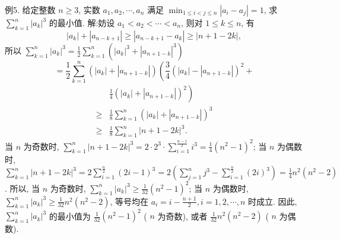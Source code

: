 例5. 给定整数 $n \geqslant 3$, 实数 $a_1, a_2, \cdots, a_n$ 满足 $\min _{1 \leqslant i<j \leqslant n}\left|a_i-a_j\right|=1$, 求 $\sum_{k=1}^n\left|a_k\right|^3$ 的最小值.
解:妨设 $a_1<a_2<\cdots<a_n$, 则对 $1 \leqslant k \leqslant n$, 有
$$
\left|a_k\right|+\left|a_{n-k+1}\right| \geqslant\left|a_{n-k+1}-a_k\right| \geqslant|n+1-2 k|,
$$
所以 $\sum_{k=1}^n\left|a_k\right|^3=\frac{1}{2} \sum_{k=1}^n\left(\left|a_k\right|^3+\left|a_{n+1-k}\right|^3\right)$
$$
=\frac{1}{2} \sum_{k=1}^n\left(\left|a_k\right|+\left|a_{n+1-k}\right|\right)\left(\frac{3}{4}\left(\left|a_k\right|-\left|a_{n+1-k}\right|\right)^2+\right.
$$
$$
\begin{aligned}
& \left.\frac{1}{4}\left(\left|a_k\right|+\left|a_{n+1-k}\right|\right)^2\right) \\
\geqslant & \frac{1}{8} \sum_{k=1}^n\left(\left|a_k\right|+\left|a_{n+1-k}\right|\right)^3 \\
\geqslant & \frac{1}{8} \sum_{k=1}^n|n+1-2 k|^3 .
\end{aligned}
$$
当 $n$ 为奇数时, $\sum_{k=1}^n|n+1-2 k|^3=2 \cdot 2^3 \cdot \sum_{i=1}^{\frac{n-1}{2}} i^3=\frac{1}{4}\left(n^2-1\right)^2$;
当 $n$ 为偶数时, $\sum_{k=1}^n|n+1-2 k|^3=2 \sum_{i=1}^{\frac{n}{2}}(2 i-1)^3=2\left(\sum_{j=1}^n j^3-\right. \left.\sum_{i=1}^{\frac{n}{2}}(2 i)^3\right)=\frac{1}{4} n^2\left(n^2-2\right)$.
所以, 当 $n$ 为奇数时, $\sum_{k=1}^n\left|a_k\right|^3 \geqslant \frac{1}{32}\left(n^2-1\right)^2$;
当 $n$ 为偶数时, $\sum_{k=1}^n\left|a_k\right|^3 \geqslant \frac{1}{32} n^2\left(n^2-2\right)$, 等号均在 $a_i=i-\frac{n+1}{2}, i= 1,2, \cdots, n$ 时成立.
因此, $\sum_{k=1}^n\left|a_k\right|^3$ 的最小值为 $\frac{1}{32}\left(n^2-1\right)^2$ ( $n$ 为奇数), 或者 $\frac{1}{32} n^2\left(n^2-2\right)$ ( $n$ 为偶数).



